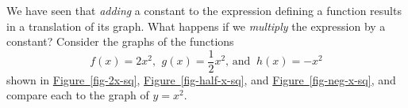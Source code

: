 \documentclass[10pt,]{book}
\theoremstyle{plain}
\theoremstyle{definition}
\theoremstyle{definition}
\numberwithin{equation}{section}
\newcommand{\hrulethin}  {\noalign{\hrule height 0.04em}}
\newcommand{\hrulethick} {\noalign{\hrule height 0.11em}}
\newcounter{figstack}
\newcounter{figindex}
\newlength\fight
\newcommand\pushValignCaptionBottom[5][b]{%
\stepcounter{figstack}%
\expandafter\def\csname %
figalign\romannumeral\value{figstack}\endcsname{#1}%
\expandafter\def\csname %
figtype\romannumeral\value{figstack}\endcsname{#2}%
\expandafter\def\csname %
figwd\romannumeral\value{figstack}\endcsname{#3}%
\expandafter\def\csname %
figcontent\romannumeral\value{figstack}\endcsname{#4}%
\expandafter\def\csname %
figcap\romannumeral\value{figstack}\endcsname{#5}%
\setbox0=\hbox{%
\begin{#2}{#3}#4\end{#2}}%
\ifdim\dimexpr\ht0+\dp0\relax>\fight\global\setlength{\fight}{%
\dimexpr\ht0+\dp0\relax}\fi%
}
\newcommand\popValignCaptionBottom{%
\setcounter{figindex}{0}%
\hfill%
\whiledo{\value{figindex}<\value{figstack}}{%
\stepcounter{figindex}%
\def\tmp{\csname figwd\romannumeral\value{figindex}\endcsname}%
\begin{\csname figtype\romannumeral\value{figindex}\endcsname}[t]{\tmp}%
\centering%
\stackinset{c}{}%
{\csname figalign\romannumeral\value{figindex}\endcsname}{}%
{\csname figcontent\romannumeral\value{figindex}\endcsname}%
{\rule{0pt}{\fight}}\par%
\csname figcap\romannumeral\value{figindex}\endcsname%
\end{\csname figtype\romannumeral\value{figindex}\endcsname}%
\hfill%
}%
\setcounter{figstack}{0}%
\setlength{\fight}{0pt}%
\hfill%
}
\begin{document}
    We have seen that \emph{adding} a constant to the expression defining a function results in a translation of its graph. What happens if we \emph{multiply} the expression by a constant? Consider the graphs of the functions
    \begin{equation*}
        f(x)= 2x^2 \text{, } ~g(x)= \frac{1}{2}x^2 \text{, and } ~h(x) = −x^2
    \end{equation*}
    shown in \hyperref[fig-2x-sq]{Figure~\ref{fig-2x-sq}}, \hyperref[fig-half-x-sq]{Figure~\ref{fig-half-x-sq}}, and \hyperref[fig-neg-x-sq]{Figure~\ref{fig-neg-x-sq}}, and compare each to the graph of \(y = x^2\).
%
\leavevmode%
\par
\end{document}
